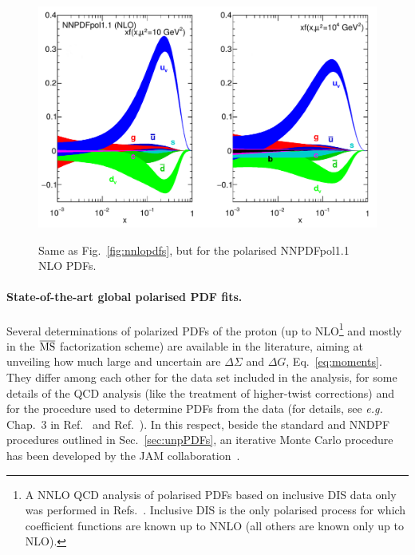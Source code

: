 \begin{figure}[!t]
\centering
\includegraphics[scale=0.4]{plots/NNPDFpol}\\
\caption{\small Same as Fig.~\ref{fig:nnlopdfs}, 
but for the polarised NNPDFpol1.1 NLO PDFs.}
\label{fig:qPDFpol}
\end{figure}

\paragraph{State-of-the-art global polarised PDF fits.}

Several determinations of polarized PDFs of the proton (up to 
NLO\footnote{A NNLO QCD analysis of polarised PDFs based on inclusive DIS
data only was performed in Refs.~\cite{Shahri:2016uzl,Khanpour:2017cha}.
Inclusive DIS is the only polarised process for which coefficient functions
are known up to NNLO (all others are known only up to NLO).} 
and mostly 
in the $\overline{\rm MS}$ factorization scheme) are available in the 
literature, aiming at unveiling how much large and uncertain are 
$\Delta\Sigma$ and  $\Delta G$, Eq.~\eqref{eq:moments}. 
%
They differ among each other for the data set included in the analysis,
for some details of the QCD analysis (like the treatment of higher-twist
corrections) and for the procedure used to determine PDFs from the data 
(for details, see {\it e.g.} Chap.~3 in Ref.~\cite{Nocera:2014vla} 
and Ref.~\cite{Nocera:2016xhb}). 
%
In this respect, beside the standard and NNDPF
procedures outlined in Sec.~\ref{sec:unpPDFs},
an iterative Monte Carlo procedure has been developed by the JAM
collaboration~\cite{Sato:2016tuz}.

